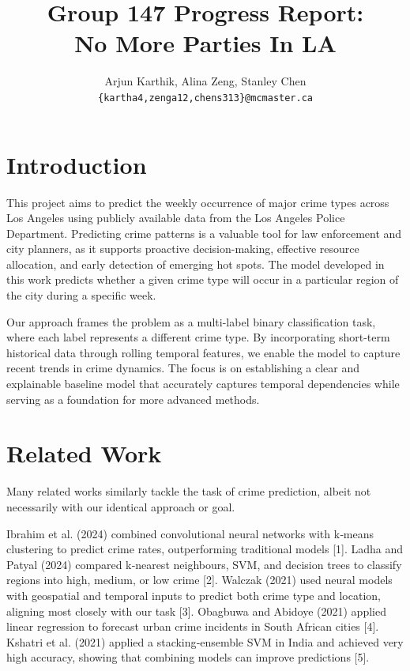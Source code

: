 \documentclass[11pt]{article}
\title{Group 147 Progress Report:\\No More Parties In LA}
\author{Arjun Karthik, Alina Zeng, Stanley Chen \\
  \texttt{\{kartha4,zenga12,chens313\}@mcmaster.ca} }
\begin{document}
\maketitle

\section{Introduction}

This project aims to predict the weekly occurrence of major crime types across Los Angeles using publicly available data from the Los Angeles Police Department. Predicting crime patterns is a valuable tool for law enforcement and city planners, as it supports proactive decision-making, effective resource allocation, and early detection of emerging hot spots. The model developed in this work predicts whether a given crime type will occur in a particular region of the city during a specific week.

Our approach frames the problem as a multi-label binary classification task, where each label represents a different crime type. By incorporating short-term historical data through rolling temporal features, we enable the model to capture recent trends in crime dynamics. The focus is on establishing a clear and explainable baseline model that accurately captures temporal dependencies while serving as a foundation for more advanced methods.

\section{Related Work}


Many related works similarly tackle the task of crime prediction, albeit not necessarily with our identical approach or goal. 

Ibrahim et al. (2024) combined convolutional neural networks with k‑means clustering to predict crime rates, outperforming traditional models [1]. Ladha and Patyal (2024) compared k‑nearest neighbours, SVM, and decision trees to classify regions into high, medium, or low crime [2]. Walczak (2021) used neural models with geospatial and temporal inputs to predict both crime type and location, aligning most closely with our task [3]. Obagbuwa and Abidoye (2021) applied linear regression to forecast urban crime incidents in South African cities [4]. Kshatri et al. (2021) applied a stacking‑ensemble SVM in India and achieved very high accuracy, showing that combining models can improve predictions [5].
\end{document}
